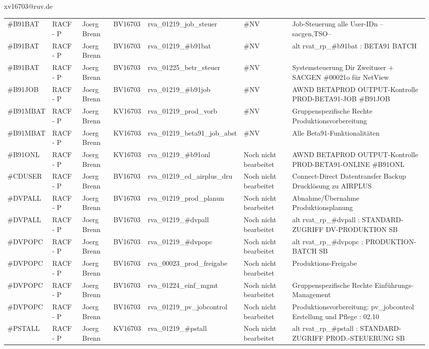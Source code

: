 \documentclass[a4paper,landscape,12pt]{letter}
\begin{document}
\begin{letter}{xv16703@ruv.de\hfill \break}
\begin{tiny}
\begin{longtable}{|p{35mm}|p{15mm}|p{25mm}|p{10mm}|p{40mm}|p{50mm}|p{50mm}|}
\#B91BAT & RACF - P & Joerg Brenn & BV16703 & rva\_01219\_job\_steuer & \#NV & Job-Steuerung alle User-IDn --sacgen,TSO-- \\
\#B91BAT & RACF - P & Joerg Brenn & BV16703 & rva\_01219\_\#b91bat & \#NV & alt rvat\_rp\_\#b91bat          : BETA91 BATCH \\
\#B91BAT & RACF - P & Joerg Brenn & BV16703 & rva\_01225\_betr\_steuer & \#NV & Systemsteuerung Dir Zweituser + SACGEN \#00021o für NetView \\
\#B91JOB & RACF - P & Joerg Brenn & BV16703 & rva\_01219\_\#b91job & \#NV & AWND BETAPROD OUTPUT-Kontrolle PROD-BETA91-JOB \#B91JOB \\
\#B91MBAT & RACF - P & Joerg Brenn & KV16703 & rva\_01219\_prod\_vorb & \#NV & Gruppenspezifische Rechte Produktionsvorbereitung \\
\#B91MBAT & RACF - P & Joerg Brenn & KV16703 & rva\_01219\_beta91\_job\_abst & \#NV & Alle Beta91-Funktionalitäten \\
\#B91ONL & RACF - P & Joerg Brenn & KV16703 & rva\_01219\_\#b91onl & Noch nicht bearbeitet & AWND BETAPROD OUTPUT-Kontrolle PROD-BETA91-ONLINE \#B91ONL \\
\#CDUSER & RACF - P & Joerg Brenn & BV16703 & rva\_01219\_cd\_airplus\_dru & Noch nicht bearbeitet & Connect-Direct Datentransfer Backup Drucklösung zu AIRPLUS \\
\#DVPALL & RACF - P & Joerg Brenn & BV16703 & rva\_01219\_prod\_planun & Noch nicht bearbeitet & Abnahme/Übernahme Produktionsplanung \\
\#DVPALL & RACF - P & Joerg Brenn & BV16703 & rva\_01219\_\#dvpall & Noch nicht bearbeitet & alt rvat\_rp\_\#dvpall          : STANDARD-ZUGRIFF DV-PRODUKTION SB \\
\#DVPOPC & RACF - P & Joerg Brenn & BV16703 & rva\_01219\_\#dvpopc & Noch nicht bearbeitet & alt rvat\_rp\_\#dvpopc          : PRODUKTION-BATCH SB \\
\#DVPOPC & RACF - P & Joerg Brenn & BV16703 & rva\_00023\_prod\_freigabe & Noch nicht bearbeitet & Produktions-Freigabe \\
\#DVPOPC & RACF - P & Joerg Brenn & BV16703 & rva\_01224\_einf\_mgmt & Noch nicht bearbeitet & Gruppenspezifische Rechte Einführungs-Management \\
\#DVPOPC & RACF - P & Joerg Brenn & BV16703 & rva\_01219\_pv\_jobcontrol & Noch nicht bearbeitet & Produktionsvorbereitung: pv\_jobcontrol Erstellung und Pflege : 02.10 \\
\#PSTALL & RACF - P & Joerg Brenn & KV16703 & rva\_01219\_\#pstall & Noch nicht bearbeitet & alt rvat\_rp\_\#pstall          : STANDARD-ZUGRIFF PROD.-STEUERUNG SB \\

\end{longtable}
\end{tiny}
\end{letter}
\end{document}
